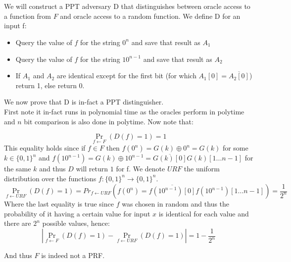 \documentclass{article}
\begin{document}
\section{}
We will construct a PPT adversary D that distinguishes between oracle access to a function from $F$ and oracle access to a random function.
We define D for an input f:
\begin{itemize}
\item Query the value of $f$ for the string $0^n$ and save that result as $A_1$
\item Query the value of $f$ for the string $10^{n-1}$ and save that result as $A_2$
\item If $A_1$ and $A_2$ are identical except for the first bit (for which $A_1[0] = \overline{A_2[0]} $) return 1, else return 0.
\end{itemize}

We now prove that D is in-fact a PPT distinguisher.\\
 First note it in-fact runs in polynomial time as the oracles perform in polytime and $n$ bit comparison is also done in polytime. Now note that:
 
\[\Pr_{f \leftarrow F}(D(f) = 1) = 1 \]
This equality holds since if $f \in F$ then $f(0^n) = G(k) \oplus 0^n = G(k)$ for some $k \in \{0,1\}^n$ and 
$f(10^{n-1}) = G(k) \oplus 10^{n-1} = \overline{G(k)[0]}G(k)[1... n-1]$  for the same $k$ and thus $D$ will return $1$ for f.
We denote $URF$ the uniform distribution over the functions $f:\{0,1\}^n \rightarrow \{0,1\}^n$.
\[\Pr_{f \leftarrow URF}(D(f) = 1) = Pr_{f \leftarrow URF}(f(0^n) = \overline{f(10^{n-1})[0]} f(10^{n-1})[1...n-1]) = \frac{1}{2^{n}}\]
Where the last equality is true since $f$ was chosen in random and thus the probability of it having a certain value for input $x$ is identical for each value and there are $2^n$ possible values, hence:
\[|\Pr_{f \leftarrow F}(D(f) = 1) - \Pr_{f \leftarrow URF}(D(f) = 1)| = 1- \frac{1}{2^n}\]

And thus $F$ is indeed not a PRF.

\section{}
\end{document}
